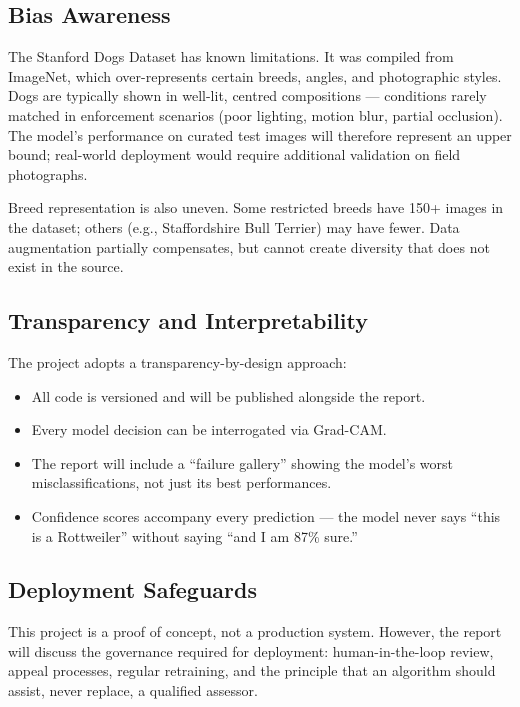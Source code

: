 \subsection{Bias Awareness}

The Stanford Dogs Dataset has known limitations. It was compiled from ImageNet, which over-represents certain breeds, angles, and photographic styles. Dogs are typically shown in well-lit, centred compositions --- conditions rarely matched in enforcement scenarios (poor lighting, motion blur, partial occlusion). The model's performance on curated test images will therefore represent an upper bound; real-world deployment would require additional validation on field photographs.

Breed representation is also uneven. Some restricted breeds have 150+ images in the dataset; others (e.g., Staffordshire Bull Terrier) may have fewer. Data augmentation partially compensates, but cannot create diversity that does not exist in the source.

\subsection{Transparency and Interpretability}

The project adopts a transparency-by-design approach:
\begin{itemize}
    \item All code is versioned and will be published alongside the report.
    \item Every model decision can be interrogated via Grad-CAM.
    \item The report will include a ``failure gallery'' showing the model's worst misclassifications, not just its best performances.
    \item Confidence scores accompany every prediction --- the model never says ``this is a Rottweiler'' without saying ``and I am 87\% sure.''
\end{itemize}

\subsection{Deployment Safeguards}

This project is a proof of concept, not a production system. However, the report will discuss the governance required for deployment: human-in-the-loop review, appeal processes, regular retraining, and the principle that an algorithm should assist, never replace, a qualified assessor.
